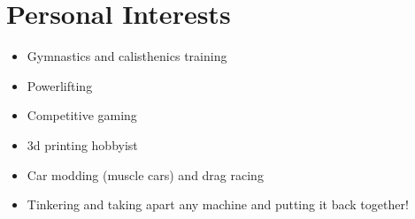 \documentclass[10pt]{article} %
\begin{document}
\medskip %


\section{Personal Interests}


\setlength{} %

\begin{paracol}{2} %

	\begin{itemize}\itemsep0em 
		\item Gymnastics and calisthenics training
		\item Powerlifting
		\item Competitive gaming	
	\end{itemize}
		
	
	\switchcolumn %
	

	\begin{itemize}\itemsep0em 
		\item 3d printing hobbyist
		\item Car modding (muscle cars) and drag racing
		\item Tinkering and taking apart any machine and putting it back together!		
	\end{itemize}

	
\end{paracol}

\medskip %

\newpage
\end{document}
